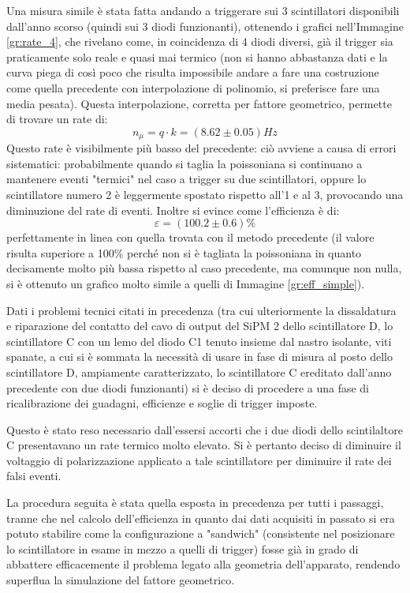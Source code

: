 Una misura simile è stata fatta andando a triggerare sui 3 scintillatori disponibili dall'anno scorso (quindi sui 3 diodi funzionanti), ottenendo i grafici nell'Immagine \ref{gr:rate_4}, che rivelano come, in coincidenza di 4 diodi diversi, già il trigger sia praticamente solo reale e quasi mai termico (non si hanno abbastanza dati e la curva piega di così poco che risulta impossibile andare a fare una costruzione come quella precedente con interpolazione di polinomio, si preferisce fare una media pesata). Questa interpolazione, corretta per fattore geometrico, permette di trovare un rate di:
\begin{equation}
  n_\mu = q \cdot k = (8.62 \pm 0.05) Hz
\end{equation}
Questo rate è visibilmente più basso del precedente: ciò avviene a causa di errori sistematici: probabilmente quando si taglia la poissoniana si continuano a mantenere eventi "termici" nel caso a trigger su due scintillatori, oppure lo scintillatore numero 2 è leggermente spostato rispetto all'1 e al 3, provocando una diminuzione del rate di eventi.
Inoltre si evince come l'efficienza è di:
\begin{equation}
  \varepsilon = (100.2 \pm 0.6)\%
\end{equation}
perfettamente in linea con quella trovata con il metodo precedente (il valore risulta superiore a 100\% perché non si è tagliata la poissoniana in quanto decisamente molto più bassa rispetto al caso precedente, ma comunque non nulla, si \`e ottenuto un grafico molto simile a quelli di Immagine \ref{gr:eff_simple}).

Dati i problemi tecnici citati in precedenza (tra cui ulteriormente la dissaldatura e riparazione del contatto del cavo di output del SiPM 2 dello scintillatore D, lo scintillatore C con un lemo del diodo C1 tenuto insieme dal nastro isolante, viti spanate, a cui si \`e sommata la necessit\`a di usare in fase di misura al posto dello scintillatore D, ampiamente caratterizzato, lo scintillatore C ereditato dall'anno precedente con due diodi funzionanti) si \`e deciso di procedere a una fase di ricalibrazione dei guadagni, efficienze e soglie di trigger imposte.

Questo \`e stato reso necessario dall'essersi accorti che i due diodi dello scintilaltore C presentavano un rate termico molto elevato. Si \`e pertanto deciso di diminuire il voltaggio di polarizzazione applicato a tale scintillatore per diminuire il rate dei falsi eventi.

La procedura seguita \`e stata quella esposta in precedenza per tutti i passaggi, tranne che nel calcolo dell'efficienza in quanto dai dati acquisiti in passato si era  potuto stabilire come la configurazione a "sandwich" (consistente nel posizionare lo scintillatore in esame in mezzo a quelli di trigger) fosse gi\`a in grado di abbattere efficacemente il problema legato alla geometria dell'apparato, rendendo superflua la simulazione del fattore geometrico.

